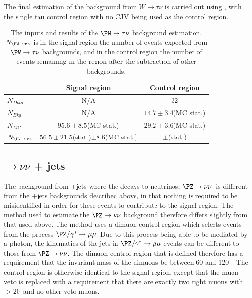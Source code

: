 The final estimation of the background from $W\rightarrow\tau\nu$ is carried out using , with the single tau control region with no \ac{CJV} being used as the control region.

\begin{table}
  \caption{The inputs and results of the $\PW\rightarrow \tau\nu$ background estimation. $N_{\PW\rightarrow \tau\nu}$ is in the signal region the number of events expected from $\PW\rightarrow \tau\nu$ backgrounds, and in the control region the number of events remaining in the region after the subtraction of other backgrounds.}
  \label{tab:promptwenu}
  \begin{tabular}{|l|c|c|}
    \hline
    & Signal region & Control region \\
    \hline
    $N_{Data}$ & N/A & 32\\
    $N_{Bkg}$ & N/A & $14.7\pm 3.4$(\ac{MC} stat.) \\
    $N_{MC}$& $95.6\pm 8.5$(\ac{MC} stat.) & $29.2\pm 3.6$(\ac{MC} stat.) \\
    $N_{\PW\rightarrow \tau\nu}$& $56.5\pm 21.5$(stat.)$\pm 8.6$(\ac{MC} stat.) & $\pm $(stat.) \\
    \hline
  \end{tabular}
\end{table}

\subsection{\PZ$\rightarrow \nu\nu$ + jets}%
\label{sec:promptznunu}
The background from \PZ+jets where the \PZ decays to neutrinos, $\PZ\rightarrow\nu\nu$, is different from the \PW+jets backgrounds described above, in that nothing is required to be misidentified in order for these events to contribute to the signal region. The method used to estimate the $\PZ\rightarrow\nu\nu$ background therefore differs slightly from that used above. The method uses a dimuon control region which selects events from the process $\PZ/\gamma^{*}\rightarrow\mu\mu$. Due to this process being able to be mediated by a photon, the kinematics of the jets in $\PZ/\gamma^{*}\rightarrow\mu\mu$ events can be different to those from $\PZ\rightarrow\nu\nu$. The dimuon control region that is defined therefore has a requirement that the invariant mass of the dimuons be between 60 and 120 \GeV\,. The control region is otherwise identical to the signal region, except that the muon veto is replaced with a requirement that there are exactly two tight muons with \pt$>20$\GeV\, and no other veto muons.

